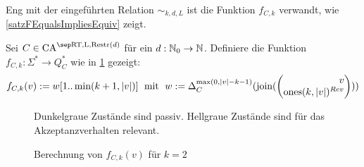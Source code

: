 Eng mit der eingeführten Relation $\sim_{k,d,L}$ ist die Funktion $f_{C,k}$ verwandt, wie \cref{satzFEqualsImpliesEquiv} zeigt.
\begin{definition}
    Sei $C \in \CAM{\CART, \CALeft, \CARestr(d)}$ für ein $d: \mathbb{N}_0 \to \mathbb{N}$. Definiere die Funktion $f_{C, k}: \Sigma^* \to Q_C^*$
    wie in \cref{fig:RestrAutomata_fCk} gezeigt:
    \[
        f_{C, k}(v) := w[1..\min(k+1, |v|)] \; \text{ mit } \; w := \Delta_C^{\max(0, |v|-k-1)}(  \joinw(\Spvek{ v; \mathrm{ones}(k, |v|)^{Rev} })  )
    \]
    
    \begin{figure}[h!]
        \begin{center}
        
        \end{center}
        \caption{Berechnung von $f_{C,k}(v)$ für $k = 2$}
        \label{fig:RestrAutomata_fCk}
        Dunkelgraue Zustände sind passiv. Hellgraue Zustände sind für das Akzeptanzverhalten relevant.
    \end{figure}
    
\end{definition}

